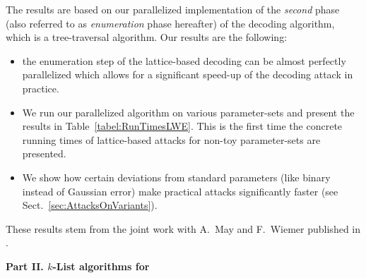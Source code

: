 The results are based on our parallelized implementation of the \emph{second} phase (also referred to as \emph{enumeration} phase hereafter) of the decoding algorithm, which is a tree-traversal algorithm. Our results are the following:
	\begin{itemize}
		\item the enumeration step of the lattice-based \LWE decoding can be almost perfectly parallelized which allows for a significant speed-up of the decoding attack in practice.
		\item We run our parallelized algorithm on various \LWE parameter-sets and present the results in Table~\ref{tabel:RunTimesLWE}. This is the first time the concrete running times of lattice-based attacks for non-toy \LWE parameter-sets are presented.  
		\item We show how certain deviations from standard \LWE parameters (like binary instead of Gaussian error) make practical attacks significantly faster (see Sect.~\ref{sec:AttacksOnVariants}).		
	\end{itemize} 

These results stem from the joint work with A.\ May and F.\ Wiemer published in \cite{ACNS:KMW16}.


\vspace{10pt}
\begin{center}
	\textbf{Part II. $k$-List algorithms for \SVP}
\end{center}  

